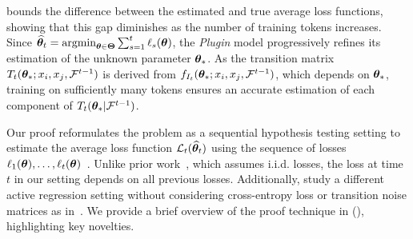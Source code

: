  bounds the difference between the estimated and true average loss functions, showing that this gap diminishes as the number of training tokens increases. Since ${\widehat{\bm{\theta}}}_t = \operatorname*{argmin}_{\bm{\theta} \in \bm{\Theta}} \sum_{s = 1}^t \ell_{s}(\bm{\theta})$, the \textit{Plugin} model progressively refines its estimation of the unknown parameter $\bm{\theta}_*$. As the transition matrix $T_t(\bm{\theta}_*; x_i, x_j, \mathcal{F}^{t-1})$ is derived from $f_{I_t}(\bm{\theta}_*; x_i, x_j, \mathcal{F}^{t-1})$, which depends on $\bm{\theta}_*$, training on sufficiently many tokens ensures an accurate estimation of each component of $T_t(\bm{\theta}_* | \mathcal{F}^{t-1})$.


Our proof reformulates the problem as a sequential hypothesis testing setting to estimate the average loss function ${\cal L}_t({\widehat{\bm{\theta}}}_t)$ using the sequence of losses $\ell_1(\bm{\theta}), \dots, \ell_t(\bm{\theta})$~\citep{naghshvar2013active, lattimore2020bandit}. Unlike prior work~\citep{frostig2015competing, chaudhuri2015convergence}, which assumes i.i.d. losses, the loss at time $t$ in our setting  depends on all previous losses. Additionally, \citet{mukherjee2022chernoff} study a different active regression setting without considering cross-entropy loss or transition noise matrices as in~\citep{patrini2017making}. We provide a brief overview of the proof technique in  (), highlighting key novelties.



